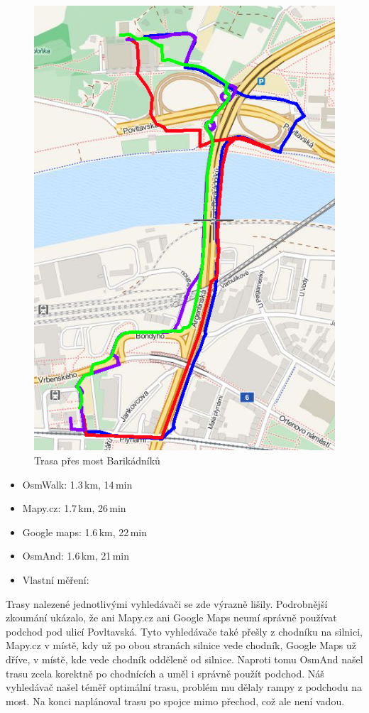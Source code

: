\begin{figure}[h]
	\centering
	\includegraphics[width=12cm]{../img/kol-hol.png}
	\caption{Trasa přes most Barikádníků}
	\label{fig:kol-hol}
\end{figure}

\begin{itemize}
	\item OsmWalk: 1.3\,km, 14\,min
	\item Mapy.cz: 1.7\,km, 26\,min
	\item Google maps: 1.6\,km, 22\,min
	\item OsmAnd: 1.6\,km, 21\,min
	\item Vlastní měření:
\end{itemize}
Trasy nalezené jednotlivými vyhledávači se zde výrazně lišily. Podrobnější
zkoumání ukázalo, že ani Mapy.cz ani Google Maps neumí správně používat podchod
pod ulicí Povltavská. Tyto vyhledávače také přešly z chodníku na silnici,
Mapy.cz v místě, kdy už po obou stranách silnice vede chodník, Google Maps už
dříve, v místě, kde vede chodník odděleně od silnice. Naproti tomu OsmAnd našel
trasu zcela korektně po chodnících a uměl i správně použít podchod. Náš
vyhledávač našel téměř optimální trasu, problém mu dělaly rampy z podchodu na
most. Na konci naplánoval trasu po spojce mimo přechod, což ale není vadou.

